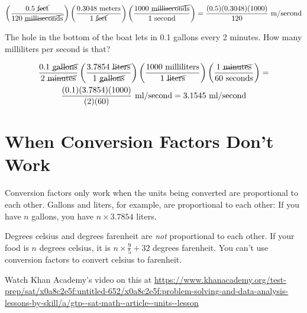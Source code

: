 \begin{multline*}
\left(\frac{0.5 \text{ \cancel{feet}}}{120 \text{ \cancel{milliseconds}}}\right) \left( \frac{0.3048 \text{ meters}}{1 \text{ \cancel{feet}}} \right) \left( \frac{ 1000 \text{ \cancel{milliseconds}}} {1 \text{ second}}\right) = \frac{(0.5)(0.3048)(1000)}{120}\text{ m/second}
\end{multline*}

\begin{Exercise}[title={Conversion Factors}, label=conversion_factors]

The hole in the bottom of the boat lets in 0.1 gallons every 2 minutes.  How many milliliters per second is that?
  
\end{Exercise}
\begin{Answer}[ref=onversion_factors]

  \begin{multline*}
    \frac{0.1 \text{ \cancel{gallons}}}{2 \text{ \cancel{minutes}}}
  \left( \frac{3.7854 \text{ \cancel{liters}}}{1 \text{ \cancel{gallons}}} \right)
  \left( \frac{1000 \text{ milliliters}}{1\text{ \cancel{liters}}}\right)
  \left( \frac{1 \text{ \cancel{minutes}}}{60 \text{ seconds}} \right) = \\
  \frac{(0.1)(3.7854)(1000)}{(2)(60)} \text{ ml/second} = 3.1545 \text{ ml/second}
  \end{multline*}
  
\end{Answer}

\section{When Conversion Factors Don't Work}

Conversion factors only work when the units being converted are
proportional to each other. Gallons and liters, for example, are
proportional to each other: If you have $n$ gallons, you have $n
\times 3.7854$ liters.

Degrees celsius and degrees farenheit are \textit{not} proportional to
each other.  If your food is $n$ degrees celsius, it is $n \times
\frac{9}{5} + 32$ degrees farenheit.  You can't use conversion factors
to convert celsius to farenheit.

Watch Khan Academy's video on this at \url{https://www.khanacademy.org/test-prep/sat/x0a8c2e5f:untitled-652/x0a8c2e5f:problem-solving-and-data-analysis-lessons-by-skill/a/gtp--sat-math--article--units--lesson}

